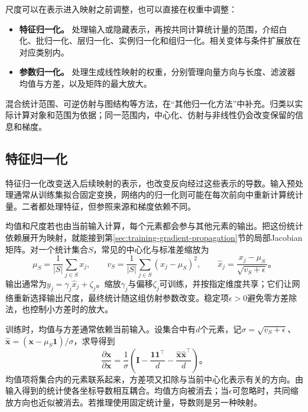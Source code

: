 尺度可以在表示进入映射之前调整，也可以直接在权重中调整：
\begin{itemize}
  \item \textbf{特征归一化。} 处理输入或隐藏表示，再按共同计算统计量的范围，介绍白化、批归一化、层归一化、实例归一化和组归一化。相关变体与条件扩展放在对应类别内。
  \item \textbf{参数归一化。} 处理生成线性映射的权重，分别管理向量方向与长度、滤波器均值与方差，以及矩阵的最大放大。
\end{itemize}
混合统计范围、可逆仿射与图结构等方法，在“其他归一化方法”中补充。归类以实际计算对象和范围为依据；同一范围内，中心化、仿射与非线性仍会改变保留的信息和梯度。

\subsection{特征归一化}
\label{sec:training-feature-normalization-methods}
\label{sec:training-normalization-principles}
特征归一化改变送入后续映射的表示，也改变反向经过这些表示的导数。输入预处理通常从训练集拟合固定变换，网络内的归一化则可能在每次前向中重新计算统计量。二者都处理特征，但参照来源和梯度依赖不同。

均值和尺度若也由当前输入计算，每个元素都会参与其他元素的输出。把这份统计依赖展开为映射，就能接到第\ref{sec:training-gradient-propagation}节的局部Jacobian矩阵。对一个统计集合$S$，常见的中心化与标准差缩放为
\begin{equation}
  \mu_S=\frac1{|S|}\sum_{j\in S}x_j,\qquad
  v_S=\frac1{|S|}\sum_{j\in S}(x_j-\mu_S)^2,\qquad
  \hat x_j=\frac{x_j-\mu_S}{\sqrt{v_S+\epsilon}}\text{。}
  \label{eq:training-normalization-common}
\end{equation}
输出通常为$y_j=\gamma_j\hat x_j+\zeta_j$。缩放$\gamma_j$与偏移$\zeta_j$可训练，并按指定维度共享；它们让网络重新选择输出尺度，最终统计随这组仿射参数改变。稳定项$\epsilon>0$避免零方差除法，也控制小方差时的放大。

训练时，均值与方差通常依赖当前输入。设集合中有$d$个元素，记$\sigma=\sqrt{v_S+\epsilon}$、$\hat{\bm x}=(\bm x-\mu_S\bm1)/\sigma$，求导得到
\begin{equation}
  \frac{\partial\hat{\bm x}}{\partial\bm x}
  =\frac1\sigma\left(\bm I-\frac{\bm1\bm1^{\top}}d
                          -\frac{\hat{\bm x}\hat{\bm x}^{\top}}d\right)\text{。}
  \label{eq:training-normalization-jacobian}
\end{equation}
均值项将集合内的元素联系起来，方差项又扣除与当前中心化表示有关的方向。由输入得到的统计使各坐标导数相互耦合。均值方向被消去；当$\epsilon$可忽略时，共同缩放方向也近似被消去。若推理使用固定统计量，导数则是另一种映射。

